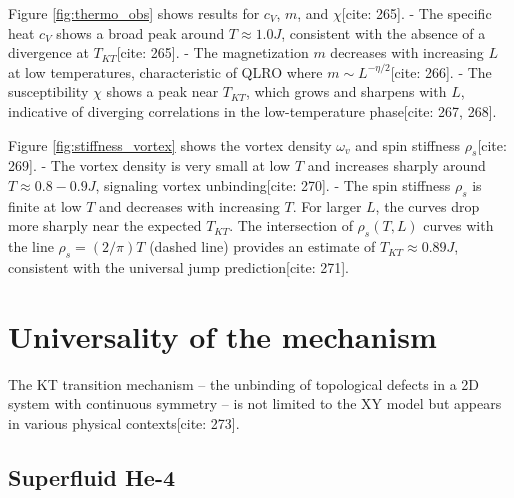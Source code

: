 \documentclass[11pt]{article}
\begin{document}
Figure \ref{fig:thermo_obs} shows results for $c_V$, $m$, and $\chi$[cite: 265].
- The specific heat $c_V$ shows a broad peak around $T \approx 1.0 J$, consistent with the absence of a divergence at $T_{KT}$[cite: 265].
- The magnetization $m$ decreases with increasing $L$ at low temperatures, characteristic of QLRO where $m \sim L^{-\eta/2}$[cite: 266].
- The susceptibility $\chi$ shows a peak near $T_{KT}$, which grows and sharpens with $L$, indicative of diverging correlations in the low-temperature phase[cite: 267, 268].

Figure \ref{fig:stiffness_vortex} shows the vortex density $\omega_v$ and spin stiffness $\rho_s$[cite: 269].
- The vortex density is very small at low $T$ and increases sharply around $T \approx 0.8-0.9 J$, signaling vortex unbinding[cite: 270].
- The spin stiffness $\rho_s$ is finite at low $T$ and decreases with increasing $T$. For larger $L$, the curves drop more sharply near the expected $T_{KT}$. The intersection of $\rho_s(T, L)$ curves with the line $\rho_s = (2/\pi)T$ (dashed line) provides an estimate of $T_{KT} \approx 0.89 J$, consistent with the universal jump prediction[cite: 271].

\section{Universality of the mechanism}

The KT transition mechanism – the unbinding of topological defects in a 2D system with continuous symmetry – is not limited to the XY model but appears in various physical contexts[cite: 273].

\subsection{Superfluid He-4}
\end{document}
